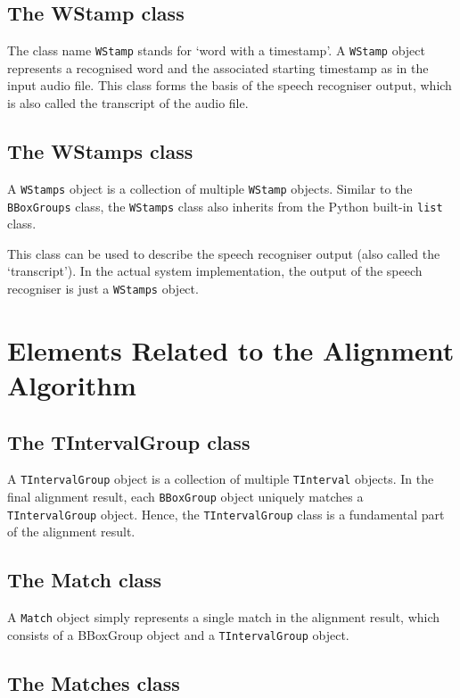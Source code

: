 \subsection{The WStamp class}

The class name \texttt{WStamp} stands for `word with a timestamp'. A \texttt{WStamp} object represents a recognised word and the associated starting timestamp as in the input audio file. This class forms the basis of the speech recogniser output, which is also called the transcript of the audio file. 

\subsection{The WStamps class}

A \texttt{WStamps} object is a collection of multiple \texttt{WStamp} objects. Similar to the \texttt{BBoxGroups} class, the \texttt{WStamps} class also inherits from the Python built-in \texttt{list} class.

This class can be used to describe the speech recogniser output (also called the `transcript'). In the actual system implementation, the output of the speech recogniser is just a \texttt{WStamps} object.

\section{Elements Related to the Alignment Algorithm}

\subsection{The TIntervalGroup class}

A \texttt{TIntervalGroup} object is a collection of multiple \texttt{TInterval} objects. In the final alignment result, each \texttt{BBoxGroup} object uniquely matches a \texttt{TIntervalGroup} object. Hence, the \texttt{TIntervalGroup} class is a fundamental part of the alignment result.

\subsection{The Match class}

A \texttt{Match} object simply represents a single match in the alignment result, which consists of a {BBoxGroup} object and a \texttt{TIntervalGroup} object. 

\subsection{The Matches class}
\label{sec:basic-elem-matches}

